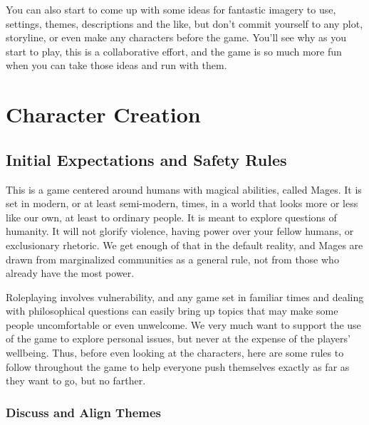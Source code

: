\documentclass[10pt,twoside,openright]{memoir}
\begin{document}
You can also start to come up with some ideas for fantastic imagery to
use, settings, themes, descriptions and the like, but don't commit
yourself to any plot, storyline, or even make any characters before the
game. You'll see why as you start to play, this is a collaborative
effort, and the game is so much more fun when you can take those ideas
and run with them.

\hypertarget{character-creation}{%
\section{Character Creation}\label{character-creation}}

\label{Safety Rules}

\hypertarget{initial-expectations-and-safety-rules}{%
\subsection{Initial Expectations and Safety
Rules}\label{initial-expectations-and-safety-rules}}

This is a game centered around humans with magical abilities, called
Mages. It is set in modern, or at least semi-modern, times, in a world
that looks more or less like our own, at least to ordinary people. It is
meant to explore questions of humanity. It will not glorify violence,
having power over your fellow humans, or exclusionary rhetoric. We get
enough of that in the default reality, and Mages are drawn from
marginalized communities as a general rule, not from those who already
have the most power.

Roleplaying involves vulnerability, and any game set in familiar times
and dealing with philosophical questions can easily bring up topics that
may make some people uncomfortable or even unwelcome. We very much want
to support the use of the game to explore personal issues, but never at
the expense of the players' wellbeing. Thus, before even looking at the
characters, here are some rules to follow throughout the game to help
everyone push themselves exactly as far as they want to go, but no
farther.

\hypertarget{discuss-and-align-themes}{%
\subsubsection{Discuss and Align
Themes}\label{discuss-and-align-themes}}
\end{document}
